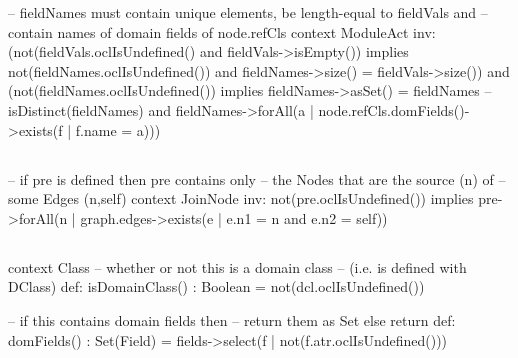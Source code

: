 \begin{lstrule}
-- fieldNames must contain unique elements, be length-equal to fieldVals and 
-- contain names of domain fields of node.refCls
context ModuleAct inv:
  (not(fieldVals.oclIsUndefined() and fieldVals->isEmpty()) implies 
    not(fieldNames.oclIsUndefined()) and fieldNames->size() = fieldVals->size()) 
  and 
  (not(fieldNames.oclIsUndefined()) implies 
    fieldNames->asSet() = fieldNames  -- isDistinct(fieldNames)
    and 
    fieldNames->forAll(a | node.refCls.domFields()->exists(f | f.name = a)))
\end{lstrule}

%
\subsection{}
\begin{lstrule}
-- if pre is defined then pre contains only 
-- the Nodes that are the source (n) of 
-- some Edges (n,self)
context JoinNode inv:
  not(pre.oclIsUndefined()) implies 
  pre->forAll(n | graph.edges->exists(e | 
    e.n1 = n and e.n2 = self))
\end{lstrule}

%
\subsection{} \label{apex:agl-Class}
\begin{lstrule}
context Class
  -- whether or not this is a domain class 
  -- (i.e. is defined with DClass)
  def: isDomainClass() : Boolean = 
    not(dcl.oclIsUndefined())
  
  -- if this contains domain fields then 
  -- return them as Set else return {} 
  def: domFields() : Set(Field) = 
  fields->select(f | 
    not(f.atr.oclIsUndefined())) 
\end{lstrule}

%
%
